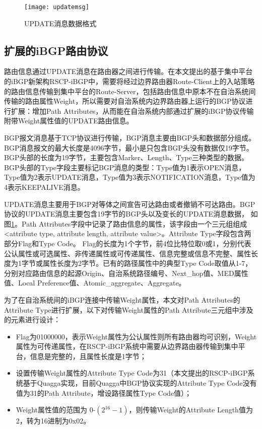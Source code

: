 \begin{figure}
  \centering
  \texttt{[image: updatemsg]}
  \caption{UPDATE消息数据格式}
  \label{fig:updatemsg}
\end{figure}



\subsection{扩展的iBGP路由协议}
路由信息通过UPDATE消息在路由器之间进行传输。在本文提出的基于集中平台的iBGP新架构RSCP-iBGP中，需要将经过边界路由器Route-Client上的入站策略的路由信息传输到集中平台的Route-Server，包括路由信息中原本不在自治系统间传输的路由属性Weight，所以需要对自治系统内边界路由器上运行的BGP协议进行扩展：增加Path Attributes，从而能在自治系统内部通过扩展的iBGP协议传输附带Weight属性值的UPDATE路由信息。

BGP报文消息\cite{rfc4271}基于TCP协议进行传输，BGP消息主要由BGP头和数据部分组成。BGP消息报文的最大长度是4096字节，最小是只包含BGP头没有数据仅19字节。BGP头部的长度为19字节，主要包含Marker、Length、Type三种类型的数据。BGP头部的Type字段主要标记BGP消息的类型：Type值为1表示OPEN消息，Type值为2表示UPDATE消息，Type值为3表示NOTIFICATION消息，Type值为4表示KEEPALIVE消息。

UPDATE消息主要用于BGP对等体之间宣告可达路由或者撤销不可达路由。BGP协议的UPDATE消息主要包含19字节的BGP头以及变长的UPDATE消息数据， 如图\ref{fig:updatemsg}。Path Attributes字段中记录了路由信息的属性，该字段由一个三元组组成<attribute type, attribute length, attribute value>。Attribute Type字段包含两部分Flag和Type Code。 Flag的长度为1个字节，前4位比特位取0或1，分别代表公认属性或可选属性、非传递属性或可传递属性、信息完整或信息不完整、属性长度为1字节或属性长度为2字节。已有的路径属性中的典型Type Code取值从1-7，分别对应路由信息的起源Origin、自治系统路径编号、Next\_hop值、MED属性值、Local Preference值、Atomic\_aggregate、Aggregate。

为了在自治系统间的iBGP连接中传输Weight属性，本文对Path Attributes的Attribute Type进行扩展，以下对传输Weight属性的Path Attribute三元组中涉及的元素进行设计：
\begin{itemize}
  \item Flag为01000000，表示Weight属性为公认属性则所有路由器均可识别，Weight属性为可传递属性，在RSCP-iBGP系统中需要从边界路由器传输到集中平台，信息是完整的，且属性长度是1字节；
  \item 设置传输Weight属性的Attribute Type Code为31（本文提出的RSCP-iBGP系统基于Quagga\cite{quagga}实现，目前Quagga中BGP协议实现的Attribute Type Code没有值为31的Path Attribute，增设路径属性Type Code值）；
  \item Weight属性值的范围为 0-$(2^{16}-1)$，则传输Weight的Attribute Length值为2，转为16进制为0x02。
\end{itemize}

